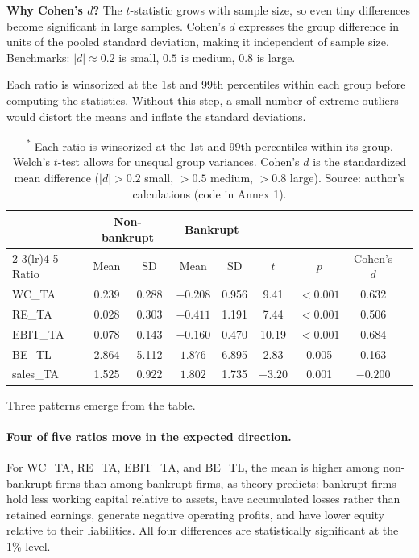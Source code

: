 \documentclass[12pt,a4paper]{article}
\begin{document}
\textbf{Why Cohen's $d$?} The $t$-statistic grows with sample size, so
even tiny differences become significant in large samples. Cohen's $d$
\citep{cohen1988} expresses the group difference in units of the pooled
standard deviation, making it independent of sample size. Benchmarks:
$|d| \approx 0.2$ is small, $0.5$ is medium, $0.8$ is large.

Each ratio is winsorized at the 1st and 99th percentiles within each group
before computing the statistics. Without this step, a small number of extreme
outliers would distort the means and inflate the standard deviations.

\begin{table}[ht]
\centering
\caption{Altman ratio means by bankruptcy status at H1.\textsuperscript{*}}
\label{tab:descriptives}
\small
\begin{tabular}{lcccccccc}
\toprule
 & \multicolumn{2}{c}{Non-bankrupt} & \multicolumn{2}{c}{Bankrupt} & & & \\
\cmidrule(lr){2-3}\cmidrule(lr){4-5}
Ratio & Mean & SD & Mean & SD & $t$ & $p$ & Cohen's $d$ \\
\midrule
WC\_TA    & 0.239 & 0.288 & $-0.208$ & 0.956 &  9.41 & $<0.001$ &  0.632 \\
RE\_TA    & 0.028 & 0.303 & $-0.411$ & 1.191 &  7.44 & $<0.001$ &  0.506 \\
EBIT\_TA  & 0.078 & 0.143 & $-0.160$ & 0.470 & 10.19 & $<0.001$ &  0.684 \\
BE\_TL    & 2.864 & 5.112 &  $1.876$ & 6.895 &  2.83 &    0.005 &  0.163 \\
sales\_TA & 1.525 & 0.922 &  $1.802$ & 1.735 & $-3.20$ &  0.001 & $-0.200$ \\
\bottomrule
\end{tabular}
\caption*{\footnotesize Group sizes (after dropping NaN, before winsorization):
non-bankrupt $n=5{,}498$, bankrupt $n=409$.}
\caption*{\footnotesize \textsuperscript{*} Each ratio is winsorized at the 1st and 99th percentiles within its group. Welch's $t$-test allows for unequal group variances. Cohen's $d$ is the standardized mean difference ($|d|>0.2$ small, $>0.5$ medium, $>0.8$ large). Source: author's calculations (code in Annex 1).}
\end{table}

Three patterns emerge from the table.

\paragraph{Four of five ratios move in the expected direction.} For WC\_TA,
RE\_TA, EBIT\_TA, and BE\_TL, the mean is higher among non-bankrupt firms
than among bankrupt firms, as theory predicts: bankrupt firms hold less
working capital relative to assets, have accumulated losses rather than
retained earnings, generate negative operating profits, and have lower equity
relative to their liabilities. All four differences are statistically
significant at the 1\% level.
\end{document}
